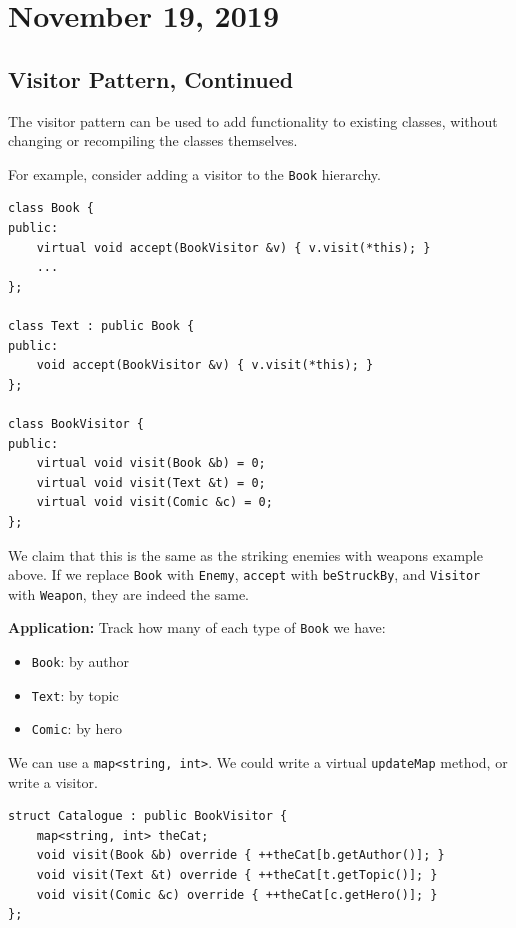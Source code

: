 \documentclass[11pt]{article}
\theoremstyle{definition}
\begin{document}
\newpage
\section{November 19, 2019}

\subsection{Visitor Pattern, Continued}
The visitor pattern can be used to add functionality to existing classes, without changing or recompiling the classes themselves.

For example, consider adding a visitor to the {\tt Book} hierarchy.
\begin{lstlisting}
class Book {
public:
    virtual void accept(BookVisitor &v) { v.visit(*this); }
    ...
};

class Text : public Book {
public:
    void accept(BookVisitor &v) { v.visit(*this); }
};

class BookVisitor {
public:
    virtual void visit(Book &b) = 0;
    virtual void visit(Text &t) = 0;
    virtual void visit(Comic &c) = 0;
};
\end{lstlisting}
\vspace{-0.25cm}
We claim that this is the same as the striking enemies with weapons example above. If we replace {\tt Book} with {\tt Enemy}, {\tt accept} with {\tt beStruckBy}, and {\tt Visitor} with {\tt Weapon}, they are indeed the same.

{\bf Application:} Track how many of each type of {\tt Book} we have: \vspace{-0.5cm}
\begin{itemize}[label={}]
\item {\tt Book}: by author\vspace{-0.25cm}
\item {\tt Text}: by topic\vspace{-0.25cm}
\item {\tt Comic}: by hero\vspace{-0.25cm}
\end{itemize}
\vspace{-0.25cm}
We can use a {\tt map<string, int>}. We could write a virtual {\tt updateMap} method, or write a visitor.
\begin{lstlisting}
struct Catalogue : public BookVisitor {
    map<string, int> theCat;
    void visit(Book &b) override { ++theCat[b.getAuthor()]; }
    void visit(Text &t) override { ++theCat[t.getTopic()]; }
    void visit(Comic &c) override { ++theCat[c.getHero()]; }
};
\end{lstlisting}
\end{document}
